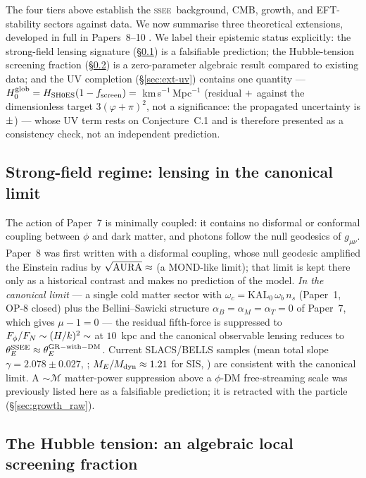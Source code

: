 \documentclass[12pt,a4paper]{article}
\newcommand{\SSEE}{\textsc{ssee}}
\newcommand{\MIRA}{\mathcal{M}}
\newcommand{\AURA}{\mathrm{AURA}}
\newcommand{\thetaE}{\theta_E}
\begin{document}
The four tiers above establish the \SSEE\ background, CMB, growth, and
EFT-stability sectors against data. We now summarise three theoretical
extensions, developed in full in Papers~8--10 \citep{AlmeidaSSEE2026P8,
AlmeidaSSEE2026P9,AlmeidaSSEE2026P10}. We label their epistemic status
explicitly: the strong-field lensing signature (\S\ref{sec:ext-sg}) is a
falsifiable prediction; the Hubble-tension screening fraction
(\S\ref{sec:ext-ht}) is a zero-parameter algebraic result compared to existing
data; and the UV completion (\S\ref{sec:ext-uv}) contains one quantity ---
$H_0^{\rm glob} = H_{\rm SH0ES}(1-f_{\rm screen}) = \val{H0_GLOBAL_d5}$~km\,s$^{-1}$\,Mpc$^{-1}$ (residual $+\val{p9_hglob_residuo}$ against the dimensionless target $3(\varphi+\pi)^2$,
not a significance: the propagated uncertainty is $\pm\val{p9_hglob_sigma}$) --- whose UV
term rests on Conjecture~C.1 and is therefore presented as a
consistency check, not an independent prediction.

\subsection{Strong-field regime: lensing in the canonical limit}
\label{sec:ext-sg}

The action of Paper~7 is minimally coupled: it contains no disformal or
conformal coupling between $\phi$ and dark matter, and photons follow the null
geodesics of $g_{\mu\nu}$. Paper~8 was first written with a disformal coupling,
whose null geodesic amplified the Einstein radius by
$\sqrt{\AURA}\approx\val{sqrt_AURA_d4}$ (a MOND-like limit); that limit is kept
there only as a historical contrast and makes no prediction of the model.
\emph{In the canonical limit} --- a single cold matter sector with
$\omega_c = \mathrm{KAL}_0\,\omega_b\,n_s$ (Paper~1, OP-8 closed) plus the
Bellini--Sawicki structure $\alpha_B=\alpha_M=\alpha_T=0$ of Paper~7, which
gives $\mu-1=0$ --- the residual fifth-force is
suppressed to $F_\phi/F_N\sim(H/k)^2\sim\val{quinta_fuerza_10kpc}$ at $10$~kpc and the
canonical observable lensing reduces to $\thetaE^{\rm SSEE}\approx
\thetaE^{\rm GR-with-DM}$. Current SLACS/BELLS samples (mean total slope
$\gamma=2.078\pm 0.027$, \citealt{Auger2010}; $M_E/M_{\rm dyn}\approx 1.21$ for SIS, \citealt{Li2018}) are consistent
with the canonical limit. A $\sim\MIRA$ matter-power suppression above a $\phi$-DM free-streaming scale
was previously listed here as a falsifiable prediction; it is retracted with the
particle (\S\ref{sec:growth_raw}).

\subsection{The Hubble tension: an algebraic local screening fraction}
\label{sec:ext-ht}
\end{document}
